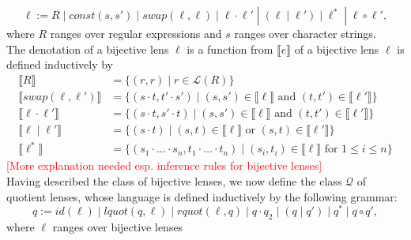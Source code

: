 \documentclass{svproc}
\newcommand{\sep}{\ensuremath{\; | \;}}
\begin{document}
$$\ell := R \sep const(s, s') \sep  swap(\ell,
\ell) \sep \ell \cdot \ell' \; |  \; (\ell \sep \ell') \sep \ell^* \;
| \; \ell \circ \ell',$$ where $R$ ranges over regular expressions and $s$
ranges over character strings.\\
The denotation of a bijective lens $\ell$ is a function from 
$\llbracket e \rrbracket$ of a bijective lens $\ell$ is defined
inductively by
\begin{align*}
\llbracket R \rrbracket &= \{(r, r) \sep r \in \mathcal{L}(R)\}\\
\llbracket swap(\ell, \ell') \rrbracket &= \{(s \cdot t, t' \cdot s') \sep
(s, s') \in \llbracket \ell \rrbracket \text{ and } (t, t') \in \llbracket
\ell' \rrbracket\}\\
\llbracket \ell \cdot \ell' \rrbracket &= \{(s \cdot t, s' \cdot t) \sep
(s, s') \in \llbracket \ell \rrbracket \text{ and } (t, t') \in \llbracket
\ell' \rrbracket\}\\
\llbracket \ell \sep \ell' \rrbracket &= \{(s \cdot t) \sep
(s, t) \in \llbracket \ell \rrbracket \text{ or } (s, t) \in \llbracket
\ell' \rrbracket\}\\
\llbracket \ell^* \rrbracket &= \{(s_1 \cdot \ldots \cdot s_n, t_1 \cdot \ldots
\cdot t_n) \sep (s_i, t_i) \in \llbracket \ell \rrbracket \text{ for } 1
\leq i \leq n\}
\end{align*}
\textcolor{red}{[More explanation needed esp. inference rules for bijective
lenses]}\\
Having described the class of bijective lenses, we now define the class
$\mathcal{Q}$ of quotient lenses, whose language is defined inductively by the
following grammar:
$$ q := id(\ell) \sep lquot(q, \ell) \sep rquot(\ell, q) \sep q
\cdot q_2 \sep (q \sep q') \sep q^* \sep q \circ q',$$
where $\ell$ ranges over bijective lenses 
\end{document}
